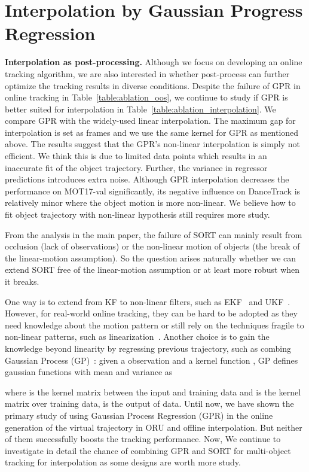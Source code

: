 \documentclass[10pt,twocolumn,letterpaper]{article}
\begin{document}
\section{Interpolation by Gaussian Progress Regression}
\label{sec:extend_non_linear}
\vspace{0.2cm}

\noindent\textbf{Interpolation as post-processing.} Although we focus on developing an online tracking algorithm, we are also interested in whether post-process can further optimize the tracking results in diverse conditions.
Despite the failure of GPR in online tracking in Table~\ref{table:ablation_oos}, we continue to study if GPR is better suited for interpolation in Table~\ref{table:ablation_interpolation}. We compare GPR with the widely-used linear interpolation. The maximum gap for interpolation is set as  frames and we use the same kernel for GPR as mentioned above. The results suggest that the GPR's non-linear interpolation is simply not efficient. We think this is due to limited data points which results in an inaccurate fit of the object trajectory. Further, the variance in regressor predictions introduces extra noise. Although GPR interpolation decreases the performance on MOT17-val significantly, its negative influence on DanceTrack is relatively minor where the object motion is more non-linear. We believe how to fit object trajectory with non-linear hypothesis still requires more study.

From the analysis in the main paper, the failure of SORT can mainly result from occlusion (lack of observations) or the non-linear motion of objects (the break of the linear-motion assumption). So the question arises naturally whether we can extend SORT free of the linear-motion assumption or at least more robust when it breaks.

One way is to extend from KF to non-linear filters, such as EKF~\cite{kalman1960contributions,ekf} and UKF~\cite{ukf}. However, for real-world online tracking, they can be hard to be adopted as they need knowledge about the motion pattern or still rely on the techniques fragile to non-linear patterns, such as linearization~\cite{ekf_survey}. Another choice is to gain the knowledge beyond linearity by regressing previous trajectory, such as combing Gaussian Process (GP)~\cite{GPR,gp_kalman,ko2009gp}: given a observation  and a kernel function , GP defines gaussian functions with mean  and variance  as 

where  is the kernel matrix between the input and training data and  is the kernel matrix over training data,  is the output of data. Until now, we have shown the primary study of using Gaussian Process Regression (GPR) in the online generation of the virtual trajectory in ORU and offline interpolation. But neither of them successfully boosts the tracking performance. Now, We continue to investigate in detail the chance of combining GPR and SORT for multi-object tracking for interpolation as some designs are worth more study.
\end{document}
